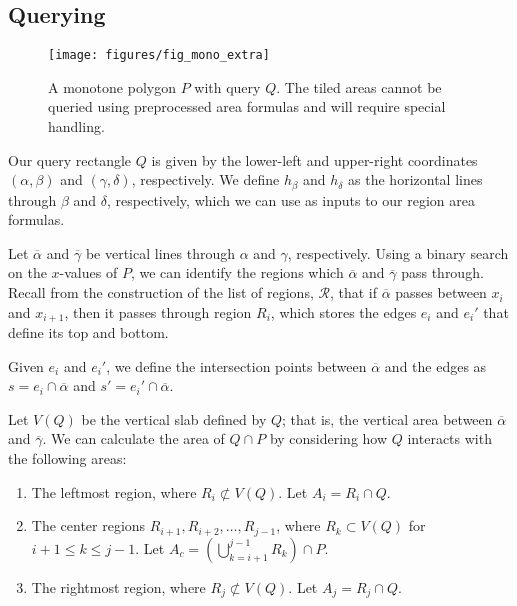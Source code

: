 \subsection{Querying}
\label{:monotonep:rect:querying}

\begin{figure}[t]
\begin{center}
  \texttt{[image: figures/fig\_mono\_extra]}
  \caption[Details of a query on a monotone polygon.]{A monotone polygon $P$ with query $Q$. The tiled areas cannot be queried using preprocessed area formulas and will require special handling.}
  \label{fig:monotonep:extra}
\end{center}
\end{figure}

Our query rectangle $Q$ is given by the lower-left and upper-right coordinates $(\alpha, \beta)$ and $(\gamma, \delta)$, respectively. We define $h_\beta$ and $h_\delta$ as the horizontal lines through $\beta$ and $\delta$, respectively, which we can use as inputs to our region area formulas.

Let $\overline{\alpha}$ and $\overline{\gamma}$ be vertical lines through $\alpha$ and $\gamma$, respectively. Using a binary search on the $x$-values of $P$, we can identify the regions which $\overline{\alpha}$ and $\overline{\gamma}$ pass through. Recall from the construction of the list of regions, $\mathcal{R}$, that if $\overline{\alpha}$ passes between $x_i$ and $x_{i+1}$, then it passes through region $R_i$, which stores the edges $e_i$ and $e_i'$ that define its top and bottom.

Given $e_i$ and $e_i'$, we define the intersection points between $\overline{\alpha}$ and the edges as $s = e_i \cap \overline{\alpha}$ and $s' = e_i' \cap \overline{\alpha}$.

Let $V(Q)$ be the vertical slab defined by $Q$; that is, the vertical area between $\overline{\alpha}$ and $\overline{\gamma}$. We can calculate the area of $Q \cap P$ by considering how $Q$ interacts with the following areas:

\begin{enumerate}
 \item The leftmost region, where $R_i \not \subset V(Q)$. Let $A_i = R_i \cap Q$.
 \item The center regions $R_{i+1}, R_{i+2}, \ldots, R_{j-1}$, where  $R_k \subset V(Q)$ for $i + 1 \leq k \leq j -1$. Let $A_c = \left ( \bigcup_{k=i+1}^{j-1}{R_k} \right ) \cap P $.
 \item The rightmost region, where $R_j \not \subset V(Q)$. Let $A_j = R_j \cap Q$. 
\end{enumerate}

